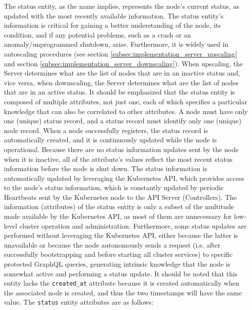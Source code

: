 The status entity, as the name implies, represents the node's current status, as
updated with the most recently available information.
\newline
The status entity's information is critical for gaining a better understanding of
the node, its condition, and if any potential problems, such as a crash or an
anomaly/unprogrammed shutdown, arise. Furthermore, it is widely used in autoscaling
procedures (see section \ref{subsec:implementation_server_upscaling} and section
\ref{subsec:implementation_server_downscaling}). When upscaling, the Server determines
what are the list of nodes that are in an inactive status and, vice versa, when downscaling,
the Server determines what are the list of nodes that are in an active status. It
should be emphasized that the status entity is composed of multiple attributes,
not just one, each of which specifies a particular knowledge that can also be correlated
to other attributes.
\newline
A node must have only one (unique) status record, and a status record must identify
only one (unique) node record. When a node successfully registers, the status record
is automatically created, and it is continuously updated while the node is
operational. Because there are no status information updates sent by the node when
it is inactive, all of the attribute's values reflect the most recent status
information before the node is shut down.
\newline
The status information is automatically updated by leveraging the Kubernetes API,
which provides access to the node's status information, which is constantly updated
by periodic Heartbeats sent by the Kubernetes node to the API Server (Controllers).
The information (attributes) of the status entity is only a subset of the
multitude made available by the Kubernetes API, as most of them are unnecessary for
low-level cluster operation and administration. Furthermore, some status updates
are performed without leveraging the Kubernetes API, either because the latter
is unavailable or because the node autonomously sends a request (i.e. after
successfully bootstrapping and before starting all cluster services) to specific
protected GraphQL queries, generating intrinsic knowledge that the node is
somewhat active and performing a status update.
\newline
It should be noted that this entity lacks the \texttt{created\_at} attribute
because it is created automatically when the associated node is created, and thus
the two timestamps will have the same value.
\newline
The \texttt{status} entity attributes are as follows:

